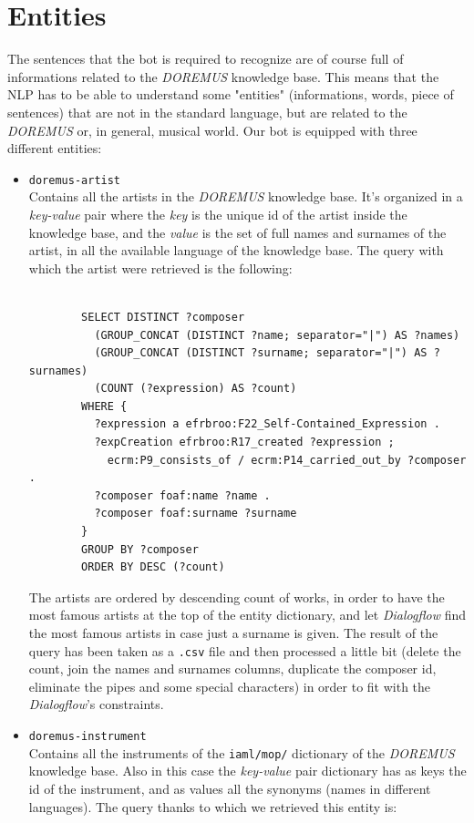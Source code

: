 \documentclass[a4paper,12pt]{report}
\begin{document}
	\section{Entities}
	The sentences that the bot is required to recognize are of course full of informations related to the \textit{DOREMUS} knowledge base. This means that the NLP has to be able to understand some "entities" (informations, words, piece of sentences) that are not in the standard language, but are related to the \textit{DOREMUS} or, in general, musical world. Our bot is equipped with three different entities:
	\begin{itemize}
		\item \texttt{doremus-artist}\\
		Contains all the artists in the \textit{DOREMUS} knowledge base. It's organized in a \textit{key-value} pair where the \textit{key} is the unique id of the artist inside the knowledge base, and the \textit{value} is the set of full names and surnames of the artist, in all the available language of the knowledge base.
		The query with which the artist were retrieved is the following:
		\begin{lstlisting}

		SELECT DISTINCT ?composer
		  (GROUP_CONCAT (DISTINCT ?name; separator="|") AS ?names)
		  (GROUP_CONCAT (DISTINCT ?surname; separator="|") AS ?surnames)
		  (COUNT (?expression) AS ?count)
		WHERE {
		  ?expression a efrbroo:F22_Self-Contained_Expression .
		  ?expCreation efrbroo:R17_created ?expression ;
		    ecrm:P9_consists_of / ecrm:P14_carried_out_by ?composer .
		  ?composer foaf:name ?name .
		  ?composer foaf:surname ?surname 
		}
		GROUP BY ?composer
		ORDER BY DESC (?count)
		\end{lstlisting}
		The artists are ordered by descending count of works, in order to have the most famous artists at the top of the entity dictionary, and let \textit{Dialogflow} find the most famous artists in case just a surname is given. The result of the query has been taken as a \texttt{.csv} file and then processed a little bit (delete the count, join the names and surnames columns, duplicate the composer id, eliminate the pipes and some special characters) in order to fit with the \textit{Dialogflow}'s constraints.
		
		\item \texttt{doremus-instrument}\\
		Contains all the instruments of the \texttt{iaml/mop/} dictionary of the \textit{DOREMUS} knowledge base. Also in this case the \textit{key-value} pair dictionary has as keys the id of the instrument, and as values all the synonyms (names in different languages). The query thanks to which we retrieved this entity is:
		\begin{lstlisting}
		

\end{lstlisting}
\end{itemize}
\end{document}
